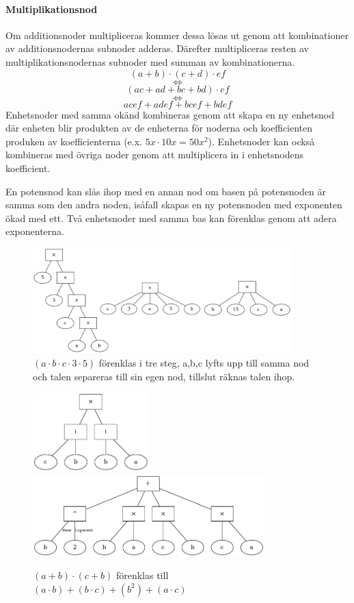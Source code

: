 \documentclass[12pt,a4paper]{article}
\begin{document}
\paragraph{Multiplikationsnod}
Om additionsnoder multipliceras kommer dessa lösas ut genom att kombinationer av additionsnodernas subnoder adderas. Därefter multipliceras resten av multiplikationsnodernas subnoder med summan av kombinationerna.
\[ \left( a+b \right) \cdot \left( c+d \right) \cdot ef \]
\[ \Leftrightarrow \]
\[ (ac + ad + bc + bd)\cdot ef \]
\[ \Leftrightarrow \]
\[ acef + adef + bcef + bdef \]
Enhetsnoder med samma okänd kombineras genom att skapa en ny enhetsnod där enheten blir produkten av de enheterna för noderna och koefficienten produken av koefficienterna (e.x. \(5x \cdot 10x = 50x^{2}\)). Enhetsnoder kan också kombineras med övriga noder genom att multiplicera in i enhetsnodens koefficient.\par
En potensnod kan slås ihop med en annan nod om basen på potensnoden är samma som den andra noden, isåfall skapas en ny potensnoden med exponenten ökad med ett. Två enhetsnoder med samma bas kan förenklas genom att adera exponenterna.
\begin{figure}[H]
  \centering
  \includegraphics[width=0.9\textwidth]{image-merged}
  \caption{\((a \cdot b \cdot c \cdot 3 \cdot 5)\) förenklas i tre steg, a,b,c lyfts upp till samma nod och talen separeras till sin egen nod, tillslut räknas talen ihop.}
  \label{fig:2313}
\end{figure}
\begin{figure}[H]
  \centering
  \includegraphics[width=0.4\textwidth]{image26}
  \includegraphics[width=0.8\textwidth]{image32}
  \caption{\((a + b) \cdot (c + b)\) förenklas till \((a \cdot b) + (b \cdot c) + (b ^ 2) + (a \cdot c)\)}
\end{figure}
\end{document}
